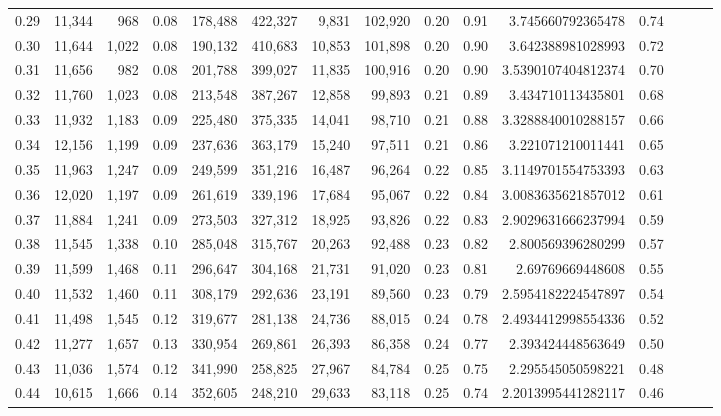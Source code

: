 \begin{tabular}{rrrrrrrrrrrrrrr}
0.29 &  11,344 &    968 &  0.08 &  178,488 &  422,327 &    9,831 &  102,920 &  0.20 &  0.91 &      3.745660792365478 &      0.74 \\
0.30 &  11,644 &  1,022 &  0.08 &  190,132 &  410,683 &   10,853 &  101,898 &  0.20 &  0.90 &      3.642388981028993 &      0.72 \\
0.31 &  11,656 &    982 &  0.08 &  201,788 &  399,027 &   11,835 &  100,916 &  0.20 &  0.90 &     3.5390107404812374 &      0.70 \\
0.32 &  11,760 &  1,023 &  0.08 &  213,548 &  387,267 &   12,858 &   99,893 &  0.21 &  0.89 &      3.434710113435801 &      0.68 \\
0.33 &  11,932 &  1,183 &  0.09 &  225,480 &  375,335 &   14,041 &   98,710 &  0.21 &  0.88 &     3.3288840010288157 &      0.66 \\
0.34 &  12,156 &  1,199 &  0.09 &  237,636 &  363,179 &   15,240 &   97,511 &  0.21 &  0.86 &      3.221071210011441 &      0.65 \\
0.35 &  11,963 &  1,247 &  0.09 &  249,599 &  351,216 &   16,487 &   96,264 &  0.22 &  0.85 &     3.1149701554753393 &      0.63 \\
0.36 &  12,020 &  1,197 &  0.09 &  261,619 &  339,196 &   17,684 &   95,067 &  0.22 &  0.84 &     3.0083635621857012 &      0.61 \\
0.37 &  11,884 &  1,241 &  0.09 &  273,503 &  327,312 &   18,925 &   93,826 &  0.22 &  0.83 &     2.9029631666237994 &      0.59 \\
0.38 &  11,545 &  1,338 &  0.10 &  285,048 &  315,767 &   20,263 &   92,488 &  0.23 &  0.82 &      2.800569396280299 &      0.57 \\
0.39 &  11,599 &  1,468 &  0.11 &  296,647 &  304,168 &   21,731 &   91,020 &  0.23 &  0.81 &       2.69769669448608 &      0.55 \\
0.40 &  11,532 &  1,460 &  0.11 &  308,179 &  292,636 &   23,191 &   89,560 &  0.23 &  0.79 &     2.5954182224547897 &      0.54 \\
0.41 &  11,498 &  1,545 &  0.12 &  319,677 &  281,138 &   24,736 &   88,015 &  0.24 &  0.78 &     2.4934412998554336 &      0.52 \\
0.42 &  11,277 &  1,657 &  0.13 &  330,954 &  269,861 &   26,393 &   86,358 &  0.24 &  0.77 &      2.393424448563649 &      0.50 \\
0.43 &  11,036 &  1,574 &  0.12 &  341,990 &  258,825 &   27,967 &   84,784 &  0.25 &  0.75 &      2.295545050598221 &      0.48 \\
0.44 &  10,615 &  1,666 &  0.14 &  352,605 &  248,210 &   29,633 &   83,118 &  0.25 &  0.74 &     2.2013995441282117 &      0.46 \\

\end{tabular}
